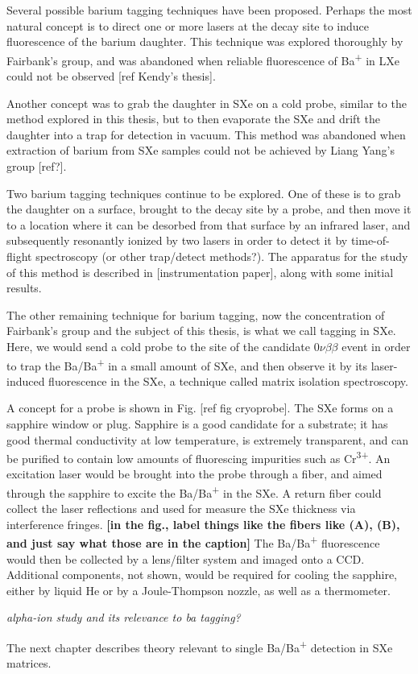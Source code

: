 Several possible barium tagging techniques have been proposed.  Perhaps the most natural concept is to direct one or more lasers at the decay site to induce fluorescence of the barium daughter.  This technique was explored thoroughly by Fairbank's group, and was abandoned when reliable fluorescence of Ba\textsuperscript{+} in LXe could not be observed [ref Kendy's thesis].

Another concept was to grab the daughter in SXe on a cold probe, similar to the method explored in this thesis, but to then evaporate the SXe and drift the daughter into a trap for detection in vacuum.  This method was abandoned when extraction of barium from SXe samples could not be achieved by Liang Yang's group [ref?].

Two barium tagging techniques continue to be explored.  One of these is to grab the daughter on a surface, brought to the decay site by a probe, and then move it to a location where it can be desorbed from that surface by an infrared laser, and subsequently resonantly ionized by two lasers in order to detect it by time-of-flight spectroscopy {\color{red}(or other trap/detect methods?)}.  The apparatus for the study of this method is described in [instrumentation paper], along with some initial results.

The other remaining technique for barium tagging, now the concentration of Fairbank's group and the subject of this thesis, is what we call tagging in SXe.  Here, we would send a cold probe to the site of the candidate $0\nu\beta\beta$ event in order to trap the Ba/Ba\textsuperscript{+} in a small amount of SXe, and then observe it by its laser-induced fluorescence in the SXe, a technique called matrix isolation spectroscopy.

A concept for a probe is shown in Fig. [ref fig cryoprobe].  The SXe forms on a sapphire window or plug.  Sapphire is a good candidate for a substrate; it has good thermal conductivity at low temperature, is extremely transparent, and can be purified to contain low amounts of fluorescing impurities such as Cr\textsuperscript{3+}.  An excitation laser would be brought into the probe through a fiber, and aimed through the sapphire to excite the Ba/Ba\textsuperscript{+} in the SXe.  A return fiber could collect the laser reflections and used for measure the SXe thickness via interference fringes.  {\color{red}\textbf{[in the fig., label things like the fibers like (A), (B), and just say what those are in the caption]}}  The Ba/Ba\textsuperscript{+} fluorescence would then be collected by a lens/filter system and imaged onto a CCD.  Additional components, not shown, would be required for cooling the sapphire, either by liquid He or by a Joule-Thompson nozzle, as well as a thermometer.

\emph{\color{gray}alpha-ion study and its relevance to ba tagging?}

The next chapter describes theory relevant to single Ba/Ba\textsuperscript{+} detection in SXe matrices.